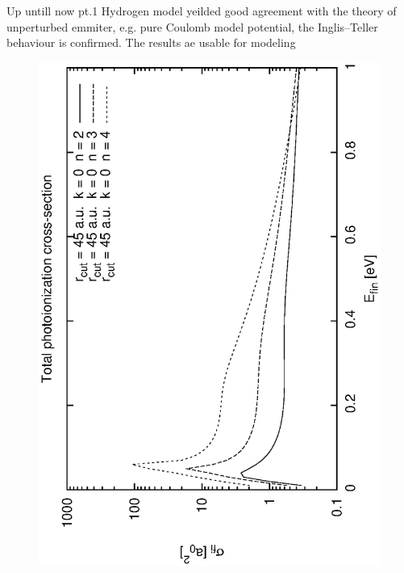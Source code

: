 \documentclass{beamer}
\begin{document}
\begin{frame}{Up untill now pt.1}
    Hydrogen model yeilded good agreement with the theory of unperturbed emmiter, e.g. pure Coulomb model potential, the Inglis–Teller behaviour is confirmed. The results ae usable for modeling
    
    \begin{figure}
        \includegraphics[scale=0.25,angle=-90]{fig/preseci_2_U0.eps}
    \hfill    

\end{figure}
\end{frame}
\end{document}
